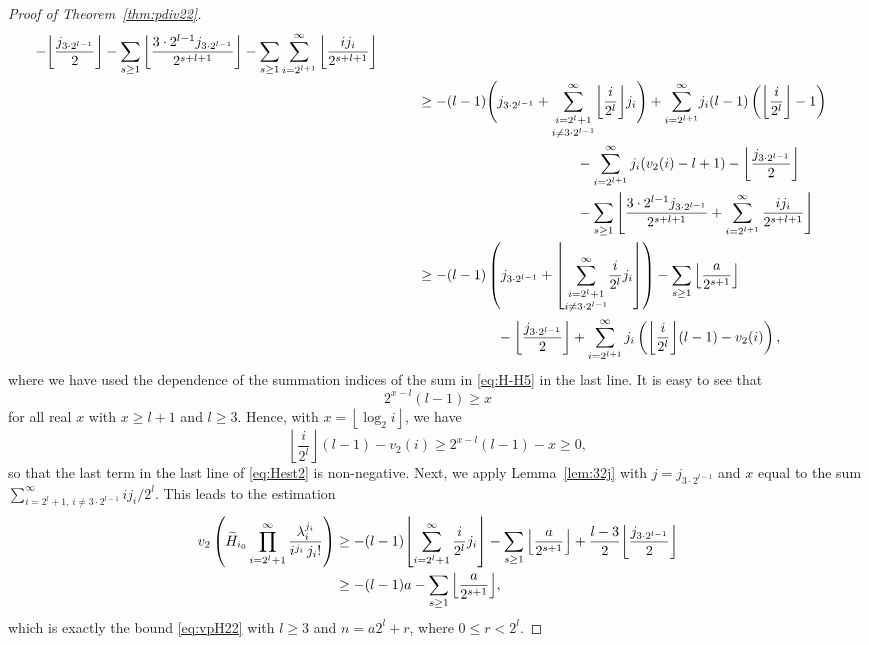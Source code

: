 \documentclass[12pt,reqno]{amsart}
\numberwithin{equation}{section}
\theoremstyle{remark}
\begin{document}
\begin{proof}[Proof of Theorem~{\em \ref{thm:pdiv22}}]
{\begin{align}
-{\left\lfloor{\frac {j_{3\cdot 2^{l-1}}} {2}}\right\rfloor}
-\sum_{s\ge1}{\left\lfloor{\frac {3\cdot 2^{l-1}j_{3\cdot 2^{l-1}}} {2^{s+l+1}}}\right\rfloor}
-\sum_{s\ge1}\sum_{i=2^{l+1}}^\infty{\left\lfloor{\frac {ij_i} {2^{s+l+1}}}\right\rfloor}\\
\notag
&\kern1cm
\ge
-(l-1)\Bigg(j_{3\cdot 2^{l-1}}
+{\underset{i\ne 3\cdot 2^{l-1}}
{\sum_{i=2^l+1}^\infty} {\left\lfloor{\frac {i} {2^l}}\right\rfloor}j_i
}\Bigg)
+
{\sum_{i=2^{l+1}}^\infty} j_i(l-1)\left({\left\lfloor{\frac {i} {2^l}}\right\rfloor}-1\right)
\\
\notag
&\kern5cm
-\sum_{i=2^{l+1}}^\infty j_i(v_2(i)-l+1)
-{\left\lfloor{\frac {j_{3\cdot 2^{l-1}}} {2}}\right\rfloor}
\\
\notag
&\kern5cm
-\sum_{s\ge1}\Bigg\lfloor
{\frac {3\cdot 2^{l-1}j_{3\cdot 2^{l-1}}} {2^{s+l+1}}}
+\sum_{i=2^{l+1}}^\infty\frac {ij_i}
{2^{s+l+1}}\Bigg\rfloor\\
\notag
&\kern1cm
\ge
-(l-1)\left(j_{3\cdot 2^{l-1}}
+{\left\lfloor{\underset{i\ne 3\cdot 2^{l-1}}
{\sum_{i=2^l+1}^\infty} {\frac {i} {2^l}}j_i
}\right\rfloor}\right)
-\sum_{s\ge1}{\left\lfloor{\frac {a} {2^{s+1}}}\right\rfloor}\\
&\kern3cm
-{\left\lfloor{\frac {j_{3\cdot 2^{l-1}}} {2}}\right\rfloor}
+\sum_{i=2^{l+1}}^\infty j_i\left({\left\lfloor{\frac {i} {2^l}}\right\rfloor}(l-1)-v_2(i)\right)
,
\label{eq:Hest2}
\end{align}}where we have used
the dependence of the summation indices of the sum
in \eqref{eq:H-H5} in the last line. It is easy to see that
$$
2^{x-l}(l-1)\ge x
$$
for all real $x$ with $x\ge l+1$ and $l\ge3$. 
Hence, with $x={\left\lfloor{\log_2 i}\right\rfloor}$, we have
$$
{\left\lfloor{\frac {i} {2^l}}\right\rfloor}(l-1)-v_2(i)\ge
2^{x-l}(l-1)-x\ge0,
$$
so that the last term in the last line of \eqref{eq:Hest2} is 
non-negative. Next, we apply Lemma~\ref{lem:32j} with
$j=j_{3\cdot 2^{l-1}}$ and $x$ equal to the sum 
${\sum_{i=2^l+1,\,i\ne 3\cdot 2^{l-1}}^\infty} {{i} }j_i/2^l$.
This leads to the estimation
\begin{align} 
\notag
v_2\left(\widetilde H_{i_0}
\prod _{i=2^l+1} ^{\infty}
\frac {{\lambda}_i^{j_i}}
{i^{j_i}\,j_i!}\right)
&\ge
-(l-1){\left\lfloor{
\sum_{i=2^l+1}^\infty \frac {i} {2^l}j_i
}\right\rfloor}
-\sum_{s\ge1}{\left\lfloor{\frac {a} {2^{s+1}}}\right\rfloor}
+\frac {l-3} {2}{\left\lfloor{\frac {j_{3\cdot 2^{l-1}}} {2}}\right\rfloor}
\\
&\ge
-(l-1)a
-\sum_{s\ge1}{\left\lfloor{\frac {a} {2^{s+1}}}\right\rfloor}
,
\label{eq:Hest2a}
\end{align}
which is exactly the bound \eqref{eq:vpH22} with $l\ge3$ and
$n=a2^l+r$, where $0\le r<2^l$.


\end{proof}
\end{document}
